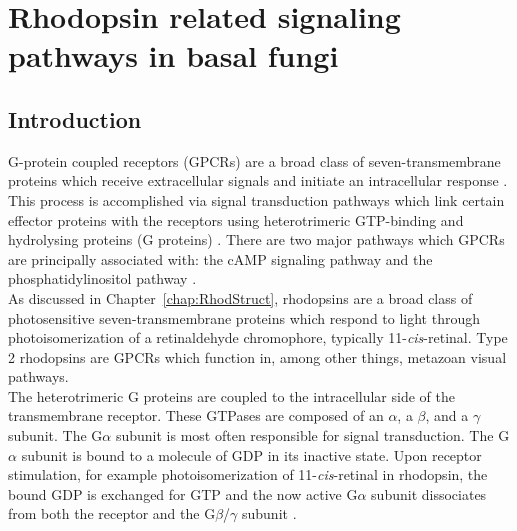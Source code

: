 \chapter{Rhodopsin related signaling pathways in basal fungi}
\label{chap:RhodAux}
\section{Introduction}
\indent G-protein coupled receptors (GPCRs) are a broad class of seven-transmembrane proteins which receive extracellular signals and initiate an intracellular response \cite{Lagerstrom2008}. This process is accomplished via signal transduction pathways which link certain effector proteins with the receptors using heterotrimeric GTP-binding and hydrolysing proteins (G proteins) \cite{Hepler1992}. There are two major pathways which GPCRs are principally associated with: the cAMP signaling pathway and the phosphatidylinositol pathway \cite{Gilman1987}.\\
\indent As discussed in Chapter~\ref{chap:RhodStruct}, rhodopsins are a broad class of photosensitive seven-transmembrane proteins which respond to light through photoisomerization of a retinaldehyde chromophore, typically 11-\textit{cis}-retinal. Type 2 rhodopsins are GPCRs which function in, among other things, metazoan visual pathways.\\
\indent The heterotrimeric G proteins are coupled to the intracellular side of the transmembrane receptor. These GTPases are composed of an $\alpha$, a $\beta$, and a $\gamma$ subunit. The G$\alpha$ subunit is most often responsible for signal transduction. The G$\alpha$ subunit is bound to a molecule of GDP in its inactive state. Upon receptor stimulation, for example photoisomerization of 11-\textit{cis}-retinal in rhodopsin, the bound GDP is exchanged for GTP and the now active G$\alpha$ subunit dissociates from both the receptor and the G$\beta$/$\gamma$ subunit \cite{Neves2002}.\\ 
